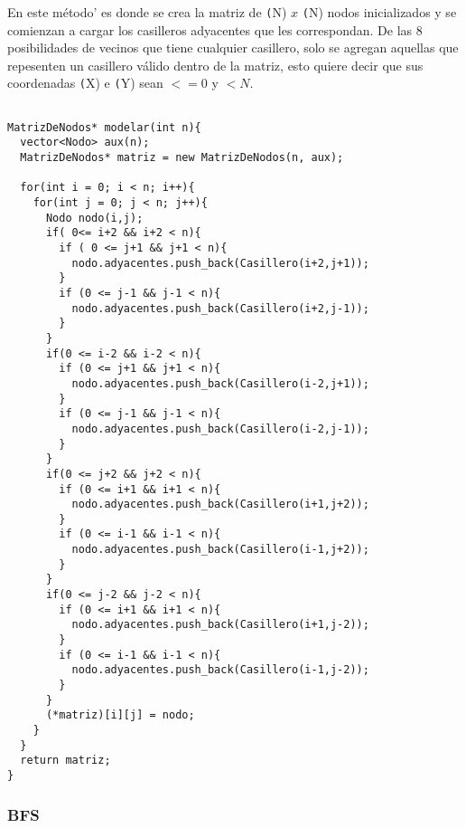 En este m\'etodo' es donde se crea la matriz de \texttt(N) $x$ \texttt(N) nodos inicializados y se comienzan a cargar los casilleros adyacentes que les correspondan.
De las 8 posibilidades de vecinos que tiene cualquier casillero, solo se agregan aquellas que repesenten un casillero v\'alido dentro de la matriz, esto quiere decir que sus coordenadas \texttt(X) e \texttt(Y) sean $<= 0$ y $< N$.

\begin{lstlisting}

MatrizDeNodos* modelar(int n){
  vector<Nodo> aux(n);
  MatrizDeNodos* matriz = new MatrizDeNodos(n, aux);

  for(int i = 0; i < n; i++){
    for(int j = 0; j < n; j++){
      Nodo nodo(i,j);
      if( 0<= i+2 && i+2 < n){
        if ( 0 <= j+1 && j+1 < n){
          nodo.adyacentes.push_back(Casillero(i+2,j+1));
        }
        if (0 <= j-1 && j-1 < n){
          nodo.adyacentes.push_back(Casillero(i+2,j-1));
        }
      }
      if(0 <= i-2 && i-2 < n){
        if (0 <= j+1 && j+1 < n){
          nodo.adyacentes.push_back(Casillero(i-2,j+1));
        }
        if (0 <= j-1 && j-1 < n){
          nodo.adyacentes.push_back(Casillero(i-2,j-1));
        }
      }
      if(0 <= j+2 && j+2 < n){
        if (0 <= i+1 && i+1 < n){
          nodo.adyacentes.push_back(Casillero(i+1,j+2));
        }
        if (0 <= i-1 && i-1 < n){
          nodo.adyacentes.push_back(Casillero(i-1,j+2));
        }
      }
      if(0 <= j-2 && j-2 < n){
        if (0 <= i+1 && i+1 < n){
          nodo.adyacentes.push_back(Casillero(i+1,j-2));
        }
        if (0 <= i-1 && i-1 < n){
          nodo.adyacentes.push_back(Casillero(i-1,j-2));
        }
      }
      (*matriz)[i][j] = nodo;
    }
  }
  return matriz;
}

\end{lstlisting}

\subsubsection{BFS}

